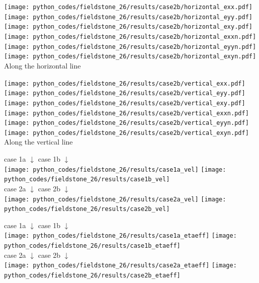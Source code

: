 \begin{center}
\texttt{[image: python\_codes/fieldstone\_26/results/case2b/horizontal\_exx.pdf]}
\texttt{[image: python\_codes/fieldstone\_26/results/case2b/horizontal\_eyy.pdf]}
\texttt{[image: python\_codes/fieldstone\_26/results/case2b/horizontal\_exy.pdf]}\\
\texttt{[image: python\_codes/fieldstone\_26/results/case2b/horizontal\_exxn.pdf]}
\texttt{[image: python\_codes/fieldstone\_26/results/case2b/horizontal\_eyyn.pdf]}
\texttt{[image: python\_codes/fieldstone\_26/results/case2b/horizontal\_exyn.pdf]}\\
{\captionfont Along the horizontal line}
\end{center}

\begin{center}
\texttt{[image: python\_codes/fieldstone\_26/results/case2b/vertical\_exx.pdf]}
\texttt{[image: python\_codes/fieldstone\_26/results/case2b/vertical\_eyy.pdf]}
\texttt{[image: python\_codes/fieldstone\_26/results/case2b/vertical\_exy.pdf]}\\
\texttt{[image: python\_codes/fieldstone\_26/results/case2b/vertical\_exxn.pdf]}
\texttt{[image: python\_codes/fieldstone\_26/results/case2b/vertical\_eyyn.pdf]}
\texttt{[image: python\_codes/fieldstone\_26/results/case2b/vertical\_exyn.pdf]}\\
{\captionfont Along the vertical line}
\end{center}


\newpage

\begin{center}
case 1a $\downarrow$ \hspace{7cm} case 1b $\downarrow$\\
\texttt{[image: python\_codes/fieldstone\_26/results/case1a\_vel]}
\texttt{[image: python\_codes/fieldstone\_26/results/case1b\_vel]}\\
case 2a $\downarrow$ \hspace{7cm} case 2b $\downarrow$\\
\texttt{[image: python\_codes/fieldstone\_26/results/case2a\_vel]}
\texttt{[image: python\_codes/fieldstone\_26/results/case2b\_vel]}
\end{center}

\begin{center}
case 1a $\downarrow$ \hspace{7cm} case 1b $\downarrow$\\
\texttt{[image: python\_codes/fieldstone\_26/results/case1a\_etaeff]}
\texttt{[image: python\_codes/fieldstone\_26/results/case1b\_etaeff]}\\
case 2a $\downarrow$ \hspace{7cm} case 2b $\downarrow$\\
\texttt{[image: python\_codes/fieldstone\_26/results/case2a\_etaeff]}
\texttt{[image: python\_codes/fieldstone\_26/results/case2b\_etaeff]}
\end{center}




